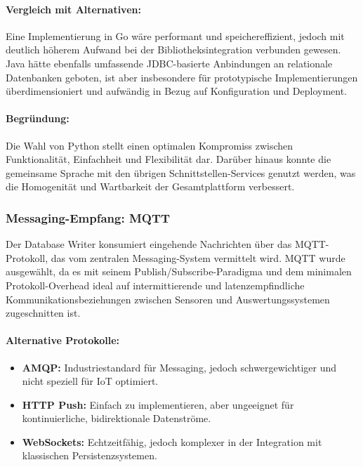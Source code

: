 \paragraph*{Vergleich mit Alternativen:}

Eine Implementierung in Go w\"are performant und speichereffizient, jedoch mit deutlich h\"oherem Aufwand bei der Bibliotheksintegration verbunden gewesen. Java h\"atte ebenfalls umfassende JDBC-basierte Anbindungen an relationale Datenbanken geboten, ist aber insbesondere f\"ur prototypische Implementierungen \"uberdimensioniert und aufw\"andig in Bezug auf Konfiguration und Deployment.

\paragraph*{Begr\"undung:}

Die Wahl von Python stellt einen optimalen Kompromiss zwischen Funktionalit\"at, Einfachheit und Flexibilit\"at dar. Dar\"uber hinaus konnte die gemeinsame Sprache mit den \"ubrigen Schnittstellen-Services genutzt werden, was die Homogenit\"at und Wartbarkeit der Gesamtplattform verbessert.

\subsubsection*{Messaging-Empfang: MQTT}

Der Database Writer konsumiert eingehende Nachrichten \"uber das MQTT-Protokoll, das vom zentralen Messaging-System vermittelt wird. MQTT wurde ausgew\"ahlt, da es mit seinem Publish/Subscribe-Paradigma und dem minimalen Protokoll-Overhead ideal auf intermittierende und latenzempfindliche Kommunikationsbeziehungen zwischen Sensoren und Auswertungssystemen zugeschnitten ist.\cite{mqtt_overview}

\paragraph*{Alternative Protokolle:}

\begin{itemize}
  \item \textbf{AMQP:} Industriestandard f\"ur Messaging, jedoch schwergewichtiger und nicht speziell f\"ur IoT optimiert.
  \item \textbf{HTTP Push:} Einfach zu implementieren, aber ungeeignet f\"ur kontinuierliche, bidirektionale Datenstr\"ome.
  \item \textbf{WebSockets:} Echtzeitf\"ahig, jedoch komplexer in der Integration mit klassischen Persistenzsystemen.
\end{itemize}

